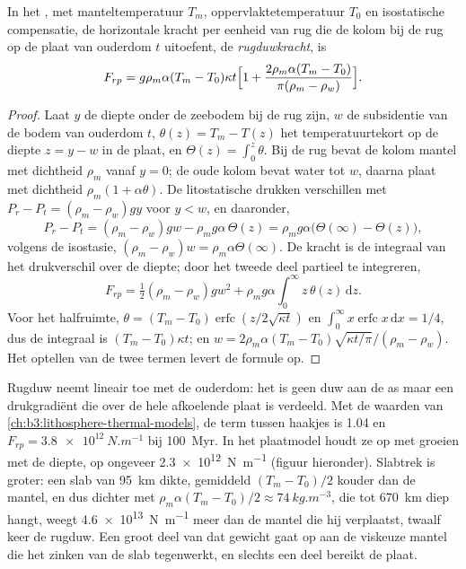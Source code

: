 \begin{proposition}[Rugduwkracht]\label{prop:b3:mantle-convection:ridge-push}
In het , met manteltemperatuur $T_m$,
oppervlaktetemperatuur $T_0$ en isostatische compensatie, de horizontale kracht per eenheid
van rug die de kolom bij de rug op de plaat van ouderdom $t$ uitoefent,
de \emph{rugduwkracht}, is
\[
  F_{rp} = g\rho_m\alpha(T_m - T_0)\kappa t\Bigl[1 + \frac{2\rho_m\alpha(T_m
  - T_0)}{\pi(\rho_m - \rho_w)}\Bigr].
\]
\end{proposition}

\begin{proof}
Laat $y$ de diepte onder de zeebodem bij de rug zijn, $w$ de subsidentie van
de bodem van ouderdom $t$, $\theta(z) = T_m - T(z)$ het temperatuurtekort op de
diepte $z = y - w$ in de plaat, en $\Theta(z) = \int_0^z\theta$. Bij de rug
bevat de kolom mantel met dichtheid $\rho_m$ vanaf $y = 0$; de oude kolom bevat
water tot $w$, daarna plaat met dichtheid $\rho_m(1 + \alpha\theta)$. De
litostatische drukken verschillen met $P_r - P_t = (\rho_m - \rho_w)gy$ voor $y < w$,
en daaronder,
\[
  P_r - P_t = (\rho_m - \rho_w)gw - \rho_mg\alpha\,\Theta(z)
  = \rho_mg\alpha\bigl(\Theta(\infty) - \Theta(z)\bigr),
\]
volgens de isostasie, $(\rho_m - \rho_w)w = \rho_m\alpha\Theta(\infty)$. De kracht is de
integraal van het drukverschil over de diepte; door het tweede deel partieel
te integreren,
\[
  F_{rp} = \tfrac12(\rho_m - \rho_w)gw^2 + \rho_mg\alpha\int_0^\infty
  z\,\theta(z)\,\mathrm dz .
\]
Voor het halfruimte, $\theta = (T_m - T_0)\operatorname{erfc}(z/2\sqrt{\kappa
t})$ en $\int_0^\infty x\operatorname{erfc}x\,\mathrm dx = 1/4$, dus de
integraal is $(T_m - T_0)\kappa t$; en $w = 2\rho_m\alpha(T_m -
T_0)\sqrt{\kappa t/\pi}/(\rho_m - \rho_w)$. Het optellen van de twee termen levert de
formule op.
\end{proof}

Rugduw neemt lineair toe met de ouderdom: het is geen duw aan de as maar een
drukgradiënt die over de hele afkoelende plaat is verdeeld. Met de waarden van
\cref{ch:b3:lithosphere-thermal-models}, de term tussen haakjes is 1.04 en $F_{rp} =
\qty{3.8e12}{N.m^{-1}}$ bij \qty{100}{Myr}. In het plaatmodel houdt ze op met groeien
met de diepte, op ongeveer \qty{2.3e12}{N.m^{-1}} (figuur hieronder). Slabtrek is
groter: een slab van \qty{95}{km} dikte, gemiddeld $(T_m - T_0)/2$ kouder dan de
mantel, en dus dichter met $\rho_m\alpha(T_m - T_0)/2 \approx
\qty{74}{kg.m^{-3}}$, die tot \qty{670}{km} diep hangt, weegt
\qty{4.6e13}{N.m^{-1}} meer dan de mantel die hij verplaatst, twaalf keer de
rugduw. Een groot deel van dat gewicht gaat op aan de viskeuze mantel die het zinken van de
slab tegenwerkt, en slechts een deel bereikt de plaat.

